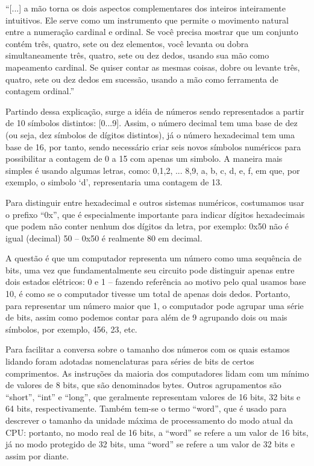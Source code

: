 ``[...] a mão torna os dois aspectos complementares dos inteiros inteiramente intuitivos. Ele serve como um instrumento que permite o movimento natural entre a numeração cardinal e ordinal. Se você precisa mostrar que um conjunto contém três, quatro, sete ou dez elementos, você levanta ou dobra simultaneamente três, quatro, sete ou dez dedos, usando sua mão como mapeamento cardinal. Se quiser contar as mesmas coisas, dobre ou levante três, quatro, sete ou dez dedos em sucessão, usando a mão como ferramenta de contagem ordinal.''

Partindo dessa explicação, surge a idéia de números sendo representados a partir de 10 símbolos distintos: [0...9]. Assim, o número decimal tem uma base de dez (ou seja, dez símbolos de dígitos distintos), já o número hexadecimal tem uma base de 16, por tanto, sendo necessário criar seis novos símbolos numéricos para possibilitar a contagem de 0 a 15 com apenas um simbolo. A maneira mais simples é usando algumas letras, como: 0,1,2, ... 8,9, a, b, c, d, e, f, em que, por exemplo, o simbolo `d', representaria uma contagem de 13.

Para distinguir entre hexadecimal e outros sistemas numéricos, costumamos usar o prefixo ``0x'', que é especialmente importante para indicar dígitos hexadecimais que podem não conter nenhum dos dígitos da letra, por exemplo: 0x50 não é igual (decimal) 50 – 0x50 é realmente 80 em decimal.

A questão é que um computador representa um número como uma sequência de bits, uma vez que fundamentalmente seu circuito pode distinguir apenas entre dois estados elétricos: 0 e 1 – fazendo referência ao motivo pelo qual usamos base 10, é como se o computador tivesse um total de apenas dois dedos. Portanto, para representar um número maior que 1, o computador pode agrupar uma série de bits, assim como podemos contar para além de 9 agrupando dois ou mais símbolos, por exemplo, 456, 23, etc.

Para facilitar a conversa sobre o tamanho dos números com os quais estamos lidando foram adotadas nomenclaturas para séries de bits de certos comprimentos. As instruções da maioria dos computadores lidam com um mínimo de valores de 8 bits, que são denominados bytes. Outros agrupamentos são ``short'', ``int'' e ``long'', que geralmente representam valores de 16 bits, 32 bits e 64 bits, respectivamente. Também tem-se o termo ``word'', que é usado para descrever o tamanho da unidade máxima de processamento do modo atual da CPU: portanto, no modo real de 16 bits, a ``word'' se refere a um valor de 16 bits, já no modo protegido de 32 bits, uma ``word'' se refere a um valor de 32 bits e assim por diante.

